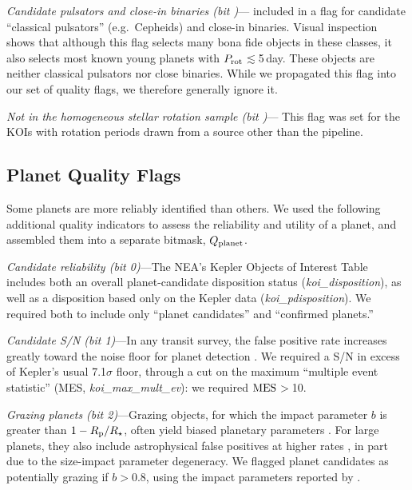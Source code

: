 \documentclass[11pt,twocolumn,tighten]{aastex63}
\begin{document}
{\it Candidate pulsators and close-in binaries (bit
)}---\citeauthor{Santos_2021} included in a flag for candidate
``classical pulsators'' (e.g.\ Cepheids) and close-in binaries.
Visual inspection shows that although this flag selects many bona fide
objects in these classes, it also selects most known young planets
with $P_{\rm rot}$$\lesssim$5\,day.  These objects are
neither classical pulsators nor close binaries.  While we propagated
this flag into our set of quality flags, we therefore generally ignore
it.

{\it Not in the homogeneous stellar rotation sample (bit )}--- This
flag was set for the KOIs with rotation periods drawn from a source
other than the \citeauthor{Santos_2019} pipeline.




\subsection{Planet Quality Flags} \label{subsec:plflags} Some planets
are more reliably identified than others.  We used the following
additional quality indicators to assess the reliability and utility of
a planet, and assembled them into a separate bitmask, $Q_{\rm
planet}$.

{\it Candidate reliability (bit 0)}---The NEA's Kepler Objects of
Interest Table includes both an overall planet-candidate disposition
status ({\it koi\_disposition}), as well as a disposition based only
on the Kepler data ({\it koi\_pdisposition}).  We required both to
include only ``planet candidates'' and ``confirmed planets.'' 

{\it Candidate S/N (bit 1)}---In any transit survey, the false
positive rate increases greatly toward the noise floor for planet
detection \citep[e.g.][]{2002ApJ...564..495J}.  We required a S/N in
excess of Kepler's usual 7.1$\sigma$ floor, through a cut on the
maximum ``multiple event statistic'' (MES, {\it koi\_max\_mult\_ev}):
we required ${\rm MES}$$>$10.

{\it Grazing planets (bit 2)}---Grazing objects, for which the impact
parameter $b$ is greater than $1-R_{\rm p}/R_\star$, often yield
biased planetary parameters \citep[e.g.][]{2022AJ....163..111G}.  For
large planets, they also include astrophysical false positives at
higher rates \citep{2016ApJ...822...86M}, in part due to the
size-impact parameter degeneracy.  We flagged planet candidates as
potentially grazing if $b$$>$0.8, using the impact parameters reported
by \citet{Thompson_2018}.
\end{document}
